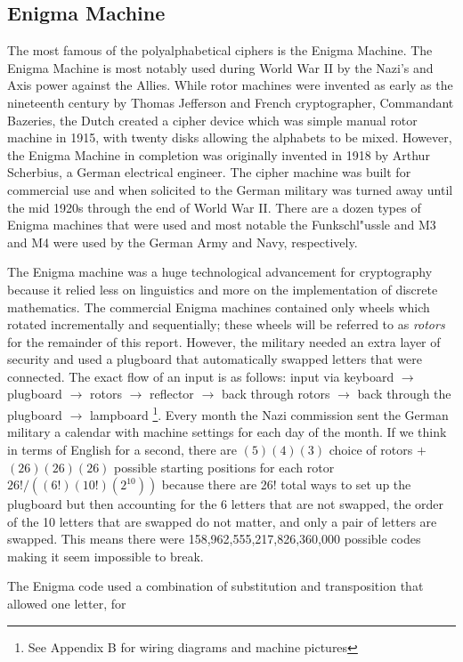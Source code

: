 \documentclass[12pt,letterpaper]{article} %
\begin{document}
\subsection{Enigma Machine}
The most famous of the polyalphabetical ciphers is the Enigma Machine.  The Enigma Machine is most notably used during World War II by the Nazi’s and Axis power against the Allies.
While rotor machines were invented as early as the nineteenth century by Thomas Jefferson and French cryptographer, Commandant Bazeries,  the Dutch created a cipher device which was simple manual rotor machine in 1915, with twenty disks allowing the alphabets to be mixed\cite{Barker1}.  However, the Enigma Machine in completion was originally invented in 1918 by Arthur Scherbius, a German electrical engineer\cite{Deutches}.  The cipher machine was built for commercial use and when solicited to the German 
military was turned away until the mid 1920s through the end of World War II\cite{Deutsches}.  There are a dozen types of Enigma machines that were used and most notable the Funkschl{"u}ssle and M3 and M4 were used by 
the German Army and Navy, respectively.  \par The Enigma machine was a huge technological advancement for cryptography because it relied less on linguistics and more on the 
implementation of discrete mathematics.  The commercial Enigma machines contained only wheels which rotated incrementally and sequentially; these wheels will be referred 
to as \emph{rotors} for the remainder of this report.  However, the military needed an extra layer of security and used a plugboard that automatically swapped letters that were connected.  The exact flow of an input is as follows: input via keyboard $\rightarrow$ plugboard  $\rightarrow$ rotors $\rightarrow$ reflector $\rightarrow$ back through rotors $\rightarrow$ back through the plugboard $\rightarrow$ lampboard \footnote{See Appendix B for wiring diagrams and machine pictures}.  Every month the Nazi commission sent  the German military
 a calendar with machine settings for each day of the month.  If we think in terms of English for a second, there are $(5)(4)(3)$ choice of rotors $+$ $(26)(26)(26)$ possible 
starting positions for each rotor $26!/((6!)(10!)(2^10))$  because there are 26! total ways to set up the plugboard but then accounting for the 6 letters 
that are not swapped, the order of the 10 letters that are swapped do not matter, and only a pair of letters are swapped.  This means there were 158,962,555,217,826,360,000 possible codes making it seem impossible to break.
\par The Enigma code used a combination of substitution and transposition that allowed one letter, for 
\end{document}
